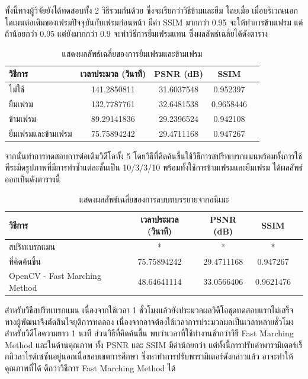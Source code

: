 \documentclass[hidelinks, a4paper,12pt]{article}
\numberwithin{equation}{section}							%
\numberwithin{equation}{section}
\begin{document}
{	\hspace{1cm}ทั้งนี้ทางผู้วิจัยยังได้ทดสอบทั้ง 2 วิธีรวมกันด้วย ซึ่งจะเรียกว่าวิธีข้ามและยืม โดยเมื่อ เมื่อบริเวณนอกโดเมนต่อเติมของเฟรมปัจจุบันกับเฟรมก่อนหน้า มีค่า SSIM มากกว่า 0.95 จะให้ทำการข้ามเฟรม แต่ถ้าน้อยกว่า 0.95 แต่ยังมากกว่า 0.9 จะทำวิธีการยืมเฟรมแทน ซึ่งผลลัพธ์เฉลี่ยได้ดังตาราง
	
	\begin{table}[H]
		\centering
		\begin{tabular}[ht]{|l|c|c|c|c|}
			\hline
			วิธีการ  & เวลาประมวล  (วินาที) & PSNR (dB) & SSIM \\
			\hline
			ไม่ใช้ & 141.2850811 & 31.6037548 & 0.952397 \\
			ยืมเฟรม & 132.7787761 & 32.6481538 & 0.9658446 \\
			ข้ามเฟรม & 89.29141836 & 29.2396524 & 0.942108 \\
			ยืมเฟรมและข้ามเฟรม & 75.75894242 & 29.4711168 & 0.947267 \\
			\hline
		\end{tabular}
		\caption{แสดงผลลัพธ์เฉลี่ยของการยืมเฟรมและข้ามเฟรม}
	\end{table}	
	
	\hspace{1cm}  จากนั้นทำการทดสอบการต่อเติมวิดีโอทั้ง 5 โดยวิธีที่คิดค้นขึ้นใช้วิธีการสปริทเบรกแมนพร้อมทั้งการใช้พีระมิดรูปภาพที่มีการทำซ้ำแต่ละชั้นเป็น 10/3/3/10  พร้อมทั้งใช้การข้ามเฟรมและยืมเฟรม ได้ผลลัพธ์ออกเป็นดังตารางนี้
	 
\begin{table}[H]
	\centering
	\begin{tabular}[ht]{|l|c|c|c|c|}
		\hline
		วิธีการ  & เวลาประมวล  (วินาที) & PSNR (dB) & SSIM \\
		\hline
		สปริทเบรกแมน & * & * & * \\
		ที่คิดค้นขึ้น & 75.75894242 & 29.4711168 & 0.947267 \\
		OpenCV - Fast Marching Method & 48.64641114 & 33.0566406 & 0.9621476 \\
		\hline
	\end{tabular}
	\caption{แสดงผลลัพธ์เฉลี่ยของการลบบทบรรยายจากอนิเมะ}
\end{table}	

\hspace{1cm} สำหรับวิธีสปริทเบรกแมน เนื่องจากใช้เวลา 1 ชั่วโมงแล้วยังประมวลผลวิดีโอชุดทดสอบแรกไม่เสร็จ ทางผู้พัฒนาจึงตัดสินใจยุติการทดลอง เนื่องจากอาจต้องใช้เวลาการประมวลผลเป็นเวลาหลายชั่วโมงสำหรับวิดีโอความยาว 1 นาที ส่วนวิธีที่คิดค้นขึ้น พบว่าเวลาที่ใช้ทำงานช้ากว่าวิธี Fast Marching Method และในด้านคุณภาพ ทั้ง PSNR และ SSIM มีค่าน้อยกว่า แต่ทั้งนี้การปรับค่าพารามิเตอร์เร็กกิวลาไรต์เซซันอยู่นอกเนื้อขอบเขตการศึกษา ซึ่งหาทำการปรับพารามิเตอร์ดังกล่าวแล้ว อาจะทำให้คุณภาพที่ได้ ดีกว่าวิธีการ Fast Marching Method ได้

}
\end{document}
